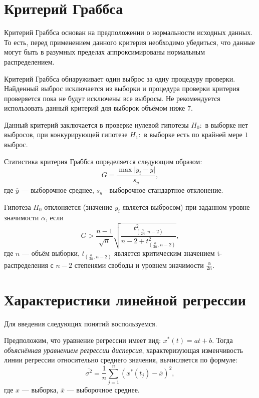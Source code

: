 
\section*{Критерий Граббса} %
\label{sec:grabbs}

Критерий Граббса основан на предположении о нормальности исходных данных. То есть, перед применением данного критерия необходимо убедиться, что данные могут быть в разумных пределах аппроксимированы нормальным распределением.

Критерий Граббса обнаруживает один выброс за одну процедуру проверки. Найденный выброс исключается из выборки и процедура проверки критерия проверяется пока не будут исключены все выбросы. Не рекомендуется использовать данный критерий для выборок объёмом ниже 7.

Данный критерий заключается в проверке нулевой гипотезы $H_0:$ в выборке нет выбросов, при конкурирующей гипотезе $H_1:$ в выборке есть по крайней мере $1$ выброс.

Статистика критерия Граббса определяется следующим образом:
\begin{equation*}
	G = \frac{\max \vert y_i - \overline{y} \vert}{s_y},
\end{equation*}
где $\overline{y}$ --- выборочное среднее, $s_y$ - выборочное стандартное отклонение.

Гипотеза $H_0$ отклоняется (значение $y_i$ является выбросом) при заданном уровне значимости $\alpha$, если
\begin{equation*}
	G > \frac{n-1}{\sqrt{n}} \sqrt{\frac{t_{\left( \frac{\alpha}{2n}, n - 2 \right)}^2}{n - 2 + t_{\left( \frac{\alpha}{2n}, n - 2 \right)}^2}},
\end{equation*}
где $n$ --- объём выборки, $t_{\left( \frac{\alpha }{2n}, n - 2 \right)}$ является критическим значением t-распределения с $n - 2$ степенями свободы и уровнем значимости $\frac{\alpha}{2n}$.


\section*{Характеристики линейной регрессии} %
\label{sec:chars_regr}

Для введения следующих понятий воспользуемся.

Предположим, что уравнение регрессии имеет вид: $x^{*}(t) = at + b$. Тогда \textit{объяснённая уравнением регрессии дисперсия}, характеризующая изменчивость линии регрессии относительно среднего значения, вычисляется по формуле:
\begin{equation}
\label{eq:var_regr}
	\overline{\sigma^2} = \frac{1}{n} \sum_{j=1}^{n}{(x^{*}(t_j) - \overline{x})^2},
\end{equation}
где $x$ --- выборка, $\overline{x}$ --- выборочное среднее.

